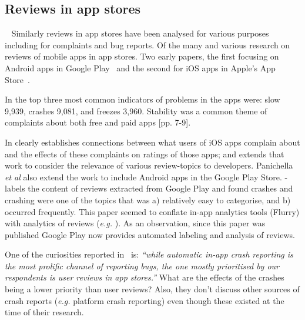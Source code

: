 \subsection{Reviews in app stores}~\label{rw-reviews-in-app-stores}
Similarly reviews in app stores have been analysed for various purposes including for complaints and bug reports. Of the many and various research on reviews of mobile apps in app stores. 
Two early papers, the first focusing on Android apps in Google Play~\textcite{fu2013_why_people_hate_your_app_making_sense_of_user_feedback_in_a_mobile_app_store} and the second for iOS  apps in Apple's App Store~\textcite{khalid2015_what_do_mobile_app_users_complain_about}.

In \textcite[p. 5][]{fu2013_why_people_hate_your_app_making_sense_of_user_feedback_in_a_mobile_app_store} the top three most common indicators of problems in the apps were: slow 9,939, crashes 9,081, and freezes 3,960. Stability was a common theme of complaints about both free and paid apps [pp. 7-9].

In  clearly establishes connections between what users of iOS apps complain about and the effects of these complaints on ratings of those apps; and  extends that work to consider the relevance of various review-topics to developers. Panichella \emph{et al} also extend the work to include Android apps in the Google Play Store.  - labels the content of reviews extracted from Google Play and found crashes and crashing were one of the topics that was a) relatively easy to categorise, and b) occurred frequently. This paper seemed to conflate in-app analytics tools (Flurry) with analytics of reviews (\emph{e.g.} ). As an observation, since this paper was published Google Play now provides automated labeling and analysis of reviews.

One of the curiosities reported in~ is: \emph{``while automatic in-app crash reporting is the most prolific channel of reporting bugs, the one mostly prioritised by our respondents is user reviews in app stores.''} What are the effects of the crashes being a lower priority than user reviews? Also, they don't discuss other sources of crash reports (\emph{e.g.} platform crash reporting) even though these existed at the time of their research.

